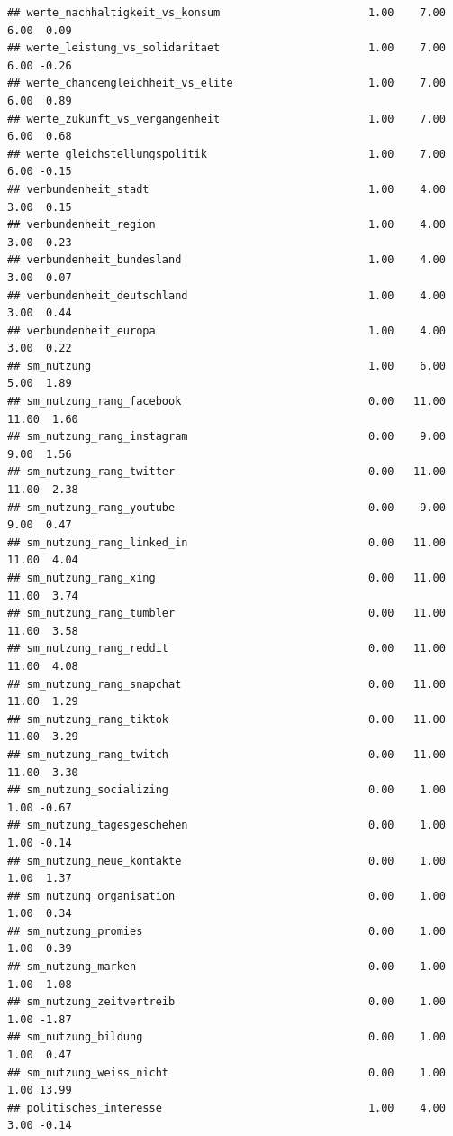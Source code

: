 \documentclass[
]{book}
\begin{document}
\begin{verbatim}
## werte_nachhaltigkeit_vs_konsum                       1.00    7.00    6.00  0.09
## werte_leistung_vs_solidaritaet                       1.00    7.00    6.00 -0.26
## werte_chancengleichheit_vs_elite                     1.00    7.00    6.00  0.89
## werte_zukunft_vs_vergangenheit                       1.00    7.00    6.00  0.68
## werte_gleichstellungspolitik                         1.00    7.00    6.00 -0.15
## verbundenheit_stadt                                  1.00    4.00    3.00  0.15
## verbundenheit_region                                 1.00    4.00    3.00  0.23
## verbundenheit_bundesland                             1.00    4.00    3.00  0.07
## verbundenheit_deutschland                            1.00    4.00    3.00  0.44
## verbundenheit_europa                                 1.00    4.00    3.00  0.22
## sm_nutzung                                           1.00    6.00    5.00  1.89
## sm_nutzung_rang_facebook                             0.00   11.00   11.00  1.60
## sm_nutzung_rang_instagram                            0.00    9.00    9.00  1.56
## sm_nutzung_rang_twitter                              0.00   11.00   11.00  2.38
## sm_nutzung_rang_youtube                              0.00    9.00    9.00  0.47
## sm_nutzung_rang_linked_in                            0.00   11.00   11.00  4.04
## sm_nutzung_rang_xing                                 0.00   11.00   11.00  3.74
## sm_nutzung_rang_tumbler                              0.00   11.00   11.00  3.58
## sm_nutzung_rang_reddit                               0.00   11.00   11.00  4.08
## sm_nutzung_rang_snapchat                             0.00   11.00   11.00  1.29
## sm_nutzung_rang_tiktok                               0.00   11.00   11.00  3.29
## sm_nutzung_rang_twitch                               0.00   11.00   11.00  3.30
## sm_nutzung_socializing                               0.00    1.00    1.00 -0.67
## sm_nutzung_tagesgeschehen                            0.00    1.00    1.00 -0.14
## sm_nutzung_neue_kontakte                             0.00    1.00    1.00  1.37
## sm_nutzung_organisation                              0.00    1.00    1.00  0.34
## sm_nutzung_promies                                   0.00    1.00    1.00  0.39
## sm_nutzung_marken                                    0.00    1.00    1.00  1.08
## sm_nutzung_zeitvertreib                              0.00    1.00    1.00 -1.87
## sm_nutzung_bildung                                   0.00    1.00    1.00  0.47
## sm_nutzung_weiss_nicht                               0.00    1.00    1.00 13.99
## politisches_interesse                                1.00    4.00    3.00 -0.14

\end{verbatim}
\end{document}
